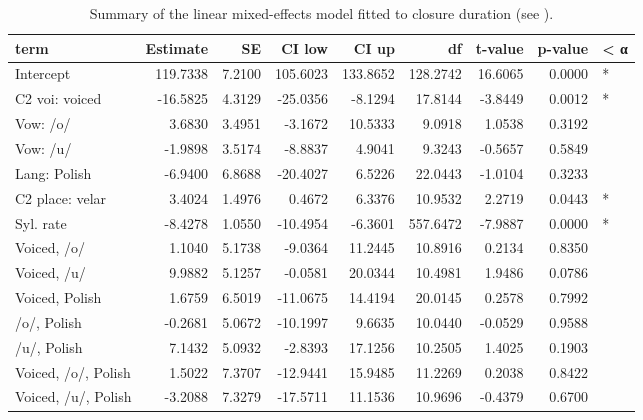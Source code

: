 \documentclass[preprint]{JASAnew}
\begin{document}
\begin{table}

\caption{\label{tab:clo-table}Summary of the linear mixed-effects model fitted to closure duration (see ).}
\centering
\begin{tabular}[t]{lrrrrrrrl}
\toprule
term & Estimate & SE & CI low & CI up & df & t-value & p-value & < α\\
\midrule
Intercept & 119.7338 & 7.2100 & 105.6023 & 133.8652 & 128.2742 & 16.6065 & 0.0000 & *\\
C2 voi: voiced & -16.5825 & 4.3129 & -25.0356 & -8.1294 & 17.8144 & -3.8449 & 0.0012 & *\\
Vow: /o/ & 3.6830 & 3.4951 & -3.1672 & 10.5333 & 9.0918 & 1.0538 & 0.3192 & \\
Vow: /u/ & -1.9898 & 3.5174 & -8.8837 & 4.9041 & 9.3243 & -0.5657 & 0.5849 & \\
Lang: Polish & -6.9400 & 6.8688 & -20.4027 & 6.5226 & 22.0443 & -1.0104 & 0.3233 & \\
\addlinespace
C2 place: velar & 3.4024 & 1.4976 & 0.4672 & 6.3376 & 10.9532 & 2.2719 & 0.0443 & *\\
Syl. rate & -8.4278 & 1.0550 & -10.4954 & -6.3601 & 557.6472 & -7.9887 & 0.0000 & *\\
Voiced, /o/ & 1.1040 & 5.1738 & -9.0364 & 11.2445 & 10.8916 & 0.2134 & 0.8350 & \\
Voiced, /u/ & 9.9882 & 5.1257 & -0.0581 & 20.0344 & 10.4981 & 1.9486 & 0.0786 & \\
Voiced, Polish & 1.6759 & 6.5019 & -11.0675 & 14.4194 & 20.0145 & 0.2578 & 0.7992 & \\
\addlinespace
/o/, Polish & -0.2681 & 5.0672 & -10.1997 & 9.6635 & 10.0440 & -0.0529 & 0.9588 & \\
/u/, Polish & 7.1432 & 5.0932 & -2.8393 & 17.1256 & 10.2505 & 1.4025 & 0.1903 & \\
Voiced, /o/, Polish & 1.5022 & 7.3707 & -12.9441 & 15.9485 & 11.2269 & 0.2038 & 0.8422 & \\
Voiced, /u/, Polish & -3.2088 & 7.3279 & -17.5711 & 11.1536 & 10.9696 & -0.4379 & 0.6700 & \\
\bottomrule
\end{tabular}
\end{table}
\end{document}
